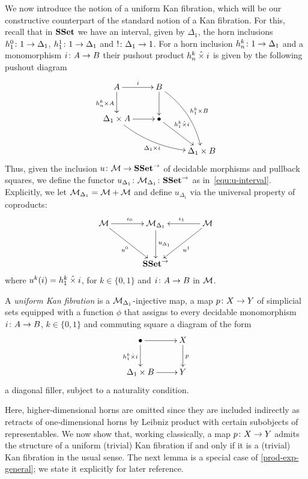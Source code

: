 \documentclass[reqno,10pt,a4paper,oneside]{amsart}
\begin{document}
We now introduce the notion of a uniform Kan fibration, which will be our constructive counterpart
of the standard notion of a Kan fibration. For this, recall that in $\SSet$ we have an interval, given by
$\Delta_1$, the horn inclusions $h^0_1 \co 1 \to \Delta_1$, $h^1_1 \co 1 \to \Delta_1$ and $! \co
\Delta_1 \to 1$. For a horn inclusion $h^{k}_n \co 1 \to \Delta_1$ and  a monomorphism $i \co A \to B$
their pushout product $h^k_n \hattimes i$ is given by the following pushout diagram
\[
\xymatrix{
 A \ar[r]^{i}  \ar[d]_{h^k_n \times A} &  B \ar@/^1em/[ddr]^{h^k_1 \times B} \ar[d] & \\ 
\Delta_1 \times A \ar@/_1em/[drr]_{\Delta_1 \times i} \ar[r] & \bullet \ar[dr]^-(.35){h^k_1 \hattimes i}  & \\ 
 & & \Delta_1 \times B} 
 \]
 Thus, given the inclusion $u \co \cal{M} \to \SSet^\to$ of decidable morphisms and pullback squares, 
 we define the functor $u_{\Delta_1} \co \cal{M}_{\Delta_1} \co \SSet^\to$ as in~\eqref{equ:u-interval}. 
 Explicitly, we let $\cal{M}_{\Delta_1} = \cal{M} + \cal{M}$ and define $u_{\Delta_1}$ via the universal
 property of coproducts:
  \[
 \xymatrix@R=1.2cm@C=1.2cm{
 \cal{M} \ar[dr]_{u^0}  \ar[r]^{\iota_0} &  \cal{M}_{\Delta_1} \ar[d]^{u_{\Delta_1}} & \cal{M} \ar[dl]^{u^1} \ar[l]_{\iota_1} \\
  & \SSet^\to & }
  \]
  where $u^k(i) = h^k_1 \hattimes i$,   for $k \in \{ 0, 1 \}$ and $i \co A \to B$ in $\cal{M}$. 
   

\begin{definition} A \emph{uniform Kan fibration} is a $\cal{M}_{\Delta_1}$-injective map, \ie 
a map  $p \co X \to Y$ of simplicial sets equipped with a function $\phi$ that assigns
to every decidable monomorphism $i \co A \to B$, $k \in \{0, 1\}$  and commuting
square a diagram of the form
\[
\xymatrix{
\bullet \ar[r] \ar[d]_{h^k_1 \hattimes i} & X \ar[d]^p \\
\Delta_1 \times B \ar[r] & Y }
\]
a diagonal filler, subject to a naturality condition. 
\end{definition} 


Here, higher-dimensional horns are omitted since they are included indirectly as retracts of one-dimensional horns 
by Leibniz product with certain subobjects of representables. We now show that, working classically, a map $p \co X \to Y$ admits the structure of a uniform (trivial) Kan fibration if and only if it is a (trivial) Kan fibration in the usual sense. 
The next lemma is a special case of \cref{prod-exp-general}; we state it explicitly for later reference.
  
\end{document}
